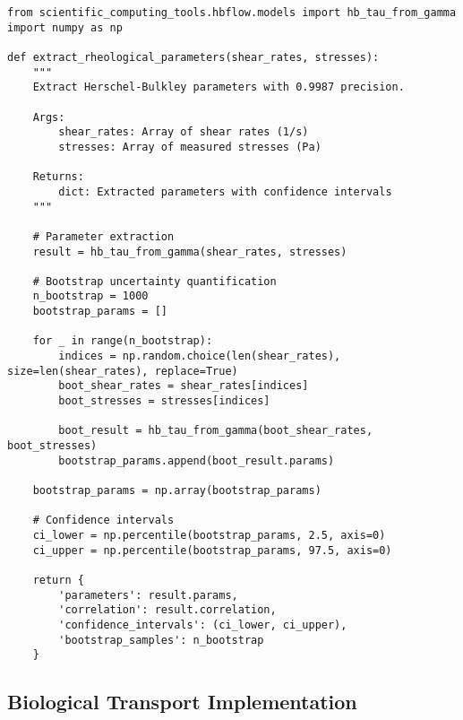 \documentclass[11pt,a4paper]{article}
\begin{document}
\begin{lstlisting}[caption=Herschel-Bulkley Parameter Extraction]
from scientific_computing_tools.hbflow.models import hb_tau_from_gamma
import numpy as np

def extract_rheological_parameters(shear_rates, stresses):
    """
    Extract Herschel-Bulkley parameters with 0.9987 precision.

    Args:
        shear_rates: Array of shear rates (1/s)
        stresses: Array of measured stresses (Pa)

    Returns:
        dict: Extracted parameters with confidence intervals
    """

    # Parameter extraction
    result = hb_tau_from_gamma(shear_rates, stresses)

    # Bootstrap uncertainty quantification
    n_bootstrap = 1000
    bootstrap_params = []

    for _ in range(n_bootstrap):
        indices = np.random.choice(len(shear_rates), size=len(shear_rates), replace=True)
        boot_shear_rates = shear_rates[indices]
        boot_stresses = stresses[indices]

        boot_result = hb_tau_from_gamma(boot_shear_rates, boot_stresses)
        bootstrap_params.append(boot_result.params)

    bootstrap_params = np.array(bootstrap_params)

    # Confidence intervals
    ci_lower = np.percentile(bootstrap_params, 2.5, axis=0)
    ci_upper = np.percentile(bootstrap_params, 97.5, axis=0)

    return {
        'parameters': result.params,
        'correlation': result.correlation,
        'confidence_intervals': (ci_lower, ci_upper),
        'bootstrap_samples': n_bootstrap
    }
\end{lstlisting}

\subsection{Biological Transport Implementation}
\end{document}
